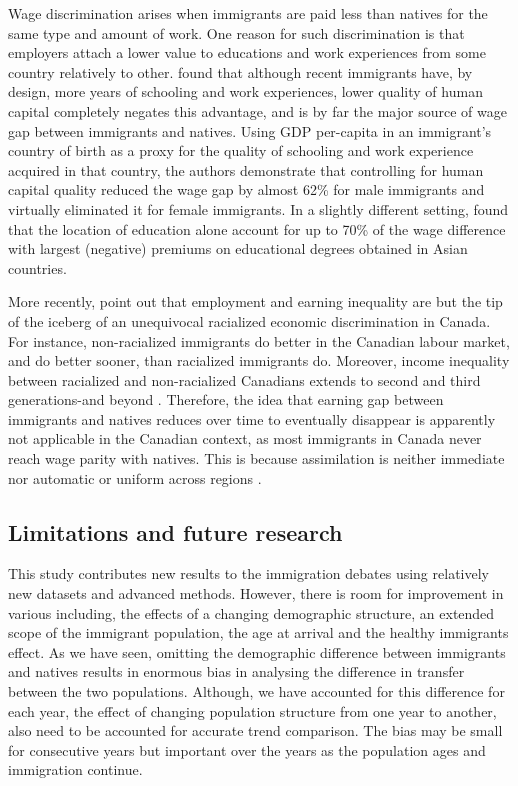 \vspace{0.7em}\par
Wage discrimination arises when immigrants are paid less than natives for the same type and amount of work.
One reason for such discrimination is that employers attach a lower value to educations and work experiences from some country relatively to other.
\citet{Coulombe:2014ir} found that although recent immigrants have, by design, more years of schooling and work experiences, lower quality of human capital completely negates this advantage, and is by far the major source of wage gap between immigrants and natives.
Using GDP per-capita in an immigrant's country of birth as a proxy for the quality of schooling and work experience acquired in that country, the authors demonstrate that controlling for human capital quality reduced the wage gap by almost 62\% for male immigrants and virtually eliminated it for female immigrants.
In a slightly different setting, \citet{Fortin:2016hl} found that the location of education alone account for up to 70\% of the wage difference with largest (negative) premiums on educational degrees obtained in Asian countries.

\vspace{0.7em}\par
More recently,  \citet{Block:2019va} point out that employment and earning inequality are but the tip of the iceberg of an unequivocal racialized economic discrimination in Canada.
For instance, non-racialized immigrants do better in the Canadian labour market, and do better sooner, than racialized immigrants do.
Moreover, income inequality between racialized and non-racialized Canadians extends to second and third generations-and beyond \citep{Block:2019va}.
Therefore, the idea that earning gap between immigrants and natives reduces over time to eventually disappear is apparently not applicable in the Canadian context, as most immigrants in Canada never reach wage parity with natives.
This is because assimilation is neither immediate nor automatic \citep{Hum:2000gz} or uniform across regions \citep{Nadeau:2010jd}.


\subsection{Limitations and future research}

This study contributes new results to the immigration debates using relatively new datasets and advanced methods.
However, there is room for improvement in various including, the effects of a changing demographic structure, an extended scope of the immigrant population, the age at arrival and the healthy immigrants effect.
As we have seen, omitting the demographic difference between immigrants and natives results in enormous bias in analysing the difference in transfer between the two populations.
Although, we have accounted for this difference for each year, the effect of changing population structure from one year to another, also need to be accounted for accurate trend comparison.
The bias may be small for consecutive years but important over the years as the population ages and immigration continue.

